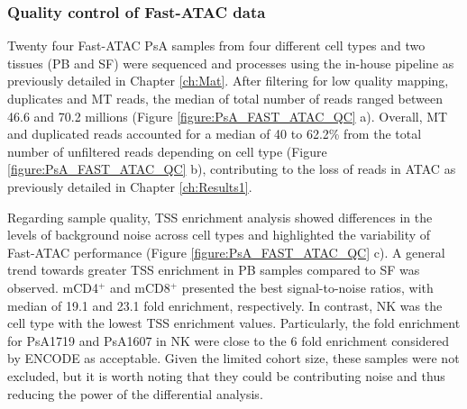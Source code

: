 \subsubsection{Quality control of Fast-ATAC data}
Twenty four Fast-ATAC PsA samples from four different cell types and two tissues (PB and SF) were sequenced and processes using the in-house pipeline as previously detailed in Chapter \ref{ch:Mat}. After filtering for low quality mapping, duplicates and MT reads, the median of total number of reads ranged between 46.6 and 70.2 millions (Figure \ref{figure:PsA_FAST_ATAC_QC} a). Overall, MT and duplicated reads accounted for a median of 40 to 62.2\% from the total number of unfiltered reads depending on cell type (Figure \ref{figure:PsA_FAST_ATAC_QC} b), contributing to the loss of reads in ATAC as previously detailed in Chapter \ref{ch:Results1}. %

Regarding sample quality, TSS enrichment analysis showed differences in the levels of background noise across cell types and highlighted the variability of Fast-ATAC performance (Figure \ref{figure:PsA_FAST_ATAC_QC} c). A general trend towards greater TSS enrichment in PB samples compared to SF was observed. mCD4$^+$ and mCD8$^+$ presented the best signal-to-noise ratios, with median of 19.1 and 23.1 fold enrichment, respectively. In contrast, NK was the cell type with the lowest TSS enrichment values. Particularly, the fold enrichment for PsA1719 and PsA1607 in NK were close to the 6 fold enrichment considered by ENCODE as acceptable. Given the limited cohort size, these samples were not excluded, but it is worth noting that they could be contributing noise and thus reducing the power of the differential analysis.

